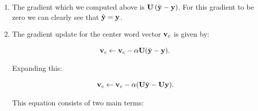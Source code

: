 \begin{parts}
{\begin{enumerate}[label=\roman*.]
{        \paragraph{Dimension Check:}
        To verify that $\frac{\partial \bJ_{\text{naive-softmax}}}{\partial \bv_c}$ has the correct shape, let's analyze the dimensions of each term:

        \begin{itemize}
            \item $\bU \in \mathbb{R}^{d \times |\text{Vocab}|}$, where $d$ is the embedding size.
            \item $\bv_c \in \mathbb{R}^{d \times 1}$, representing the center word vector.
            \item $\bu_o \in \mathbb{R}^{d \times 1}$, representing the true outside word vector.
            \item $\by, \hat{\by} \in \mathbb{R}^{|\text{Vocab}| \times 1}$, both column vectors.
        \end{itemize}

        The subtraction $\hat{\by} - \by$ results in a column vector of shape $\mathbb{R}^{|\text{Vocab}| \times 1}$.
        Since $\bU$ has shape $(d \times |\text{Vocab}|)$, multiplying:

        \[
        \bU (\hat{\by} - \by)
        \]

        gives a final result of shape $(d \times 1)$,
        which matches the expected dimension of $\frac{\partial \bJ}{\partial \bv_c}$.

        }

    \item {
        The gradient which we computed above is $\mathbf{U} \left( \hat{\mathbf{y}} - \mathbf{y} \right)$.
        For this gradient to be zero we can clearly see that $\hat{\mathbf{y}} = \mathbf{y}$.
    }
    \item {

        The gradient update for the center word vector $\mathbf{v}_c$ is given by:

        \[
        \mathbf{v}_c \gets \mathbf{v}_c - \alpha \mathbf{U} (\hat{\mathbf{y}} - \mathbf{y}).
        \]

        Expanding this:

        \[
        \mathbf{v}_c \gets \mathbf{v}_c - \alpha (\mathbf{U} \hat{\mathbf{y}} - \mathbf{U} \mathbf{y}).
        \]

        This equation consists of two main terms:

}
\end{enumerate}}
\end{parts}
